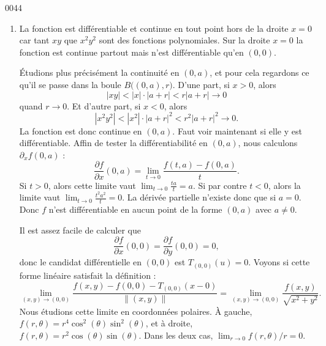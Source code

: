
\begin{corrige}{0044}

\begin{enumerate}

\item
La fonction est différentiable et continue en tout point hors de la droite $x=0$ car tant $xy$ que $x^2y^2$ sont des fonctions polynomiales. Sur la droite $x=0$ la fonction est continue partout mais n'est différentiable qu'en $(0,0)$.

Étudions plus précisément la continuité en $(0,a)$, et pour cela regardons ce qu'il se passe dans la boule $B\big( (0,a),r \big)$. D'une part, si $x>0$, alors 
\begin{equation}
	| xy |<| x |\cdot| a+r |<r| a+r |\to 0
\end{equation}
quand $r\to 0$. Et d'autre part, si $x<0$, alors
\begin{equation}
	| x^2y^2 |<| x^2 |\cdot| a+r |^2<r^2| a+r |^2\to 0.
\end{equation}
La fonction est donc continue en $(0,a)$. Faut voir maintenant si elle y est différentiable. Affin de tester la différentiabilité en $(0,a)$, nous calculons $\partial_xf(0,a)$ :
\begin{equation}
	\frac{ \partial f }{ \partial x }(0,a)=\lim_{t\to 0}\frac{ f(t,a)-f(0,a) }{ t }.
\end{equation}
Si $t>0$, alors cette limite vaut $\lim_{t\to 0}\frac{ ta }{ t }=a$. Si par contre $t<0$, alors la limite vaut $\lim_{t\to 0}\frac{ t^2a^2 }{ t }=0$. La dérivée partielle n'existe donc que si $a=0$. Donc $f$ n'est différentiable en aucun point de la forme $(0,a)$ avec $a\neq 0$.

Il est assez facile de calculer que
\begin{equation}
	\frac{ \partial f }{ \partial x }(0,0)=\frac{ \partial f }{ \partial y }(0,0)=0,
\end{equation}
donc le candidat différentielle en $(0,0)$ est $T_{(0,0)}(u)=0$. Voyons si cette forme linéaire satisfait la définition :
\begin{equation}
	\lim_{(x,y)\to(0,0)}\frac{ f(x,y)-f(0,0)-T_{(0,0)}(x-0) }{ \| (x,y) \| }=\lim_{(x,y)\to (0,0)}\frac{ f(x,y) }{ \sqrt{x^2+y^2} }.
\end{equation}
Nous étudions cette limite en coordonnées polaires. À gauche, $f(r,\theta)=r^4\cos^2(\theta)\sin^2(\theta)$, et à droite, $f(r,\theta)=r^2\cos(\theta)\sin(\theta)$. Dans les deux cas, $\lim_{r\to 0}f(r,\theta)/r=0$. 


\end{enumerate}
\end{corrige}
